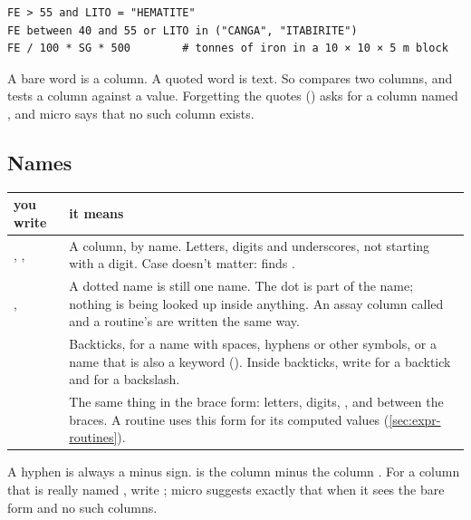 \begin{lstlisting}[language=expr]
FE > 55 and LITO = "HEMATITE"
FE between 40 and 55 or LITO in ("CANGA", "ITABIRITE")
FE / 100 * SG * 500        # tonnes of iron in a 10 × 10 × 5 m block
\end{lstlisting}

A bare word is a column. A quoted word is text. So  compares two columns, and
 tests a column against a value. Forgetting the quotes
() asks for a column named , and micro says that no such column
exists.

\subsection{Names}\label{sec:expr-names}

\begin{tabularx}{\linewidth}{@{}p{42mm}L@{}}
\toprule
you write & it means \\
\midrule
{}, ,  & A column, by name. Letters, digits and underscores, not
  starting with a digit. Case doesn't matter:  finds . \\
,  & A dotted name is still one name. The dot is part of the name;
  nothing is being looked up inside anything. An assay column called  and a routine's
   are written the same way. \\
 & Backticks, for a name with spaces, hyphens or
  other symbols, or a name that is also a keyword (). Inside
  backticks, write \code{\textbackslash\textasciigrave} for a backtick and
  \code{\textbackslash\textbackslash} for a backslash. \\
 & The same thing in the brace form: letters, digits, \code{\_},  and
  \code{-} between the braces. A routine uses this form for its computed values
  (\cref{sec:expr-routines}). \\
\bottomrule
\end{tabularx}

\begin{caution}
A hyphen is always a minus sign.  is the column  minus the column
. For a column that is really named , write
; micro suggests exactly that when it sees the bare
form and no such columns.
\end{caution}

